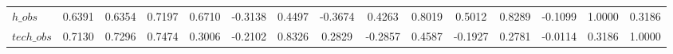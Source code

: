 \begin{center}
\begin{longtable}{lcccccccccccccc}
$h\_obs         $	 & 	           0.6391	 & 	           0.6354	 & 	           0.7197	 & 	           0.6710	 & 	          -0.3138	 & 	           0.4497	 & 	          -0.3674	 & 	           0.4263	 & 	           0.8019	 & 	           0.5012	 & 	           0.8289	 & 	          -0.1099	 & 	           1.0000	 & 	           0.3186 \\ 
$tech\_obs      $	 & 	           0.7130	 & 	           0.7296	 & 	           0.7474	 & 	           0.3006	 & 	          -0.2102	 & 	           0.8326	 & 	           0.2829	 & 	          -0.2857	 & 	           0.4587	 & 	          -0.1927	 & 	           0.2781	 & 	          -0.0114	 & 	           0.3186	 & 	           1.0000 \\ 
\end{longtable}
 \end{center}
